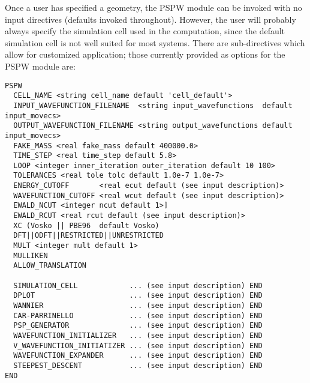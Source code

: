 Once a user has specified a geometry, the PSPW module can be invoked
with no input  directives (defaults invoked throughout).  However, the
user will probably always specify the  simulation cell used in the
computation, since the default simulation cell is not well suited for
most systems.  There are sub-directives which allow for customized
application; those currently provided as options for the PSPW module are:
\begin{verbatim}
PSPW
  CELL_NAME <string cell_name default 'cell_default'>
  INPUT_WAVEFUNCTION_FILENAME  <string input_wavefunctions  default input_movecs>
  OUTPUT_WAVEFUNCTION_FILENAME <string output_wavefunctions default input_movecs>
  FAKE_MASS <real fake_mass default 400000.0>
  TIME_STEP <real time_step default 5.8>
  LOOP <integer inner_iteration outer_iteration default 10 100>
  TOLERANCES <real tole tolc default 1.0e-7 1.0e-7>
  ENERGY_CUTOFF       <real ecut default (see input description)>
  WAVEFUNCTION_CUTOFF <real wcut default (see input description)>
  EWALD_NCUT <integer ncut default 1>]
  EWALD_RCUT <real rcut default (see input description)>
  XC (Vosko || PBE96  default Vosko)
  DFT||ODFT||RESTRICTED||UNRESTRICTED
  MULT <integer mult default 1>
  MULLIKEN
  ALLOW_TRANSLATION

  SIMULATION_CELL            ... (see input description) END
  DPLOT                      ... (see input description) END
  WANNIER                    ... (see input description) END
  CAR-PARRINELLO             ... (see input description) END
  PSP_GENERATOR              ... (see input description) END
  WAVEFUNCTION_INITIALIZER   ... (see input description) END
  V_WAVEFUNCTION_INITIATIZER ... (see input description) END
  WAVEFUNCTION_EXPANDER      ... (see input description) END
  STEEPEST_DESCENT           ... (see input description) END
END 
\end{verbatim}

